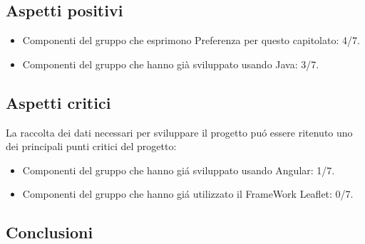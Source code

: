 \subsection{Aspetti positivi}
\begin{itemize}
\item Componenti del gruppo che esprimono Preferenza per questo capitolato: 4/7.
\item Componenti del gruppo che hanno già sviluppato usando Java: 3/7.
\end{itemize}

\subsection{Aspetti critici}
La raccolta dei dati necessari per sviluppare il progetto pu\'o essere ritenuto uno dei principali punti critici del progetto:
\begin{itemize}
\item Componenti del gruppo che hanno gi\'a sviluppato usando Angular: 1/7.
\item Componenti del gruppo che hanno gi\'a utilizzato il FrameWork Leaflet: 0/7.
\end{itemize}

\subsection{Conclusioni}
